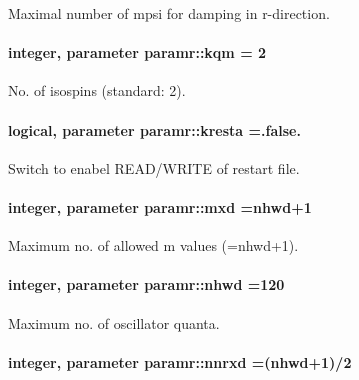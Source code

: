Maximal number of mpsi for damping in r-\/direction. 

\paragraph[{\texorpdfstring{kqm}{kqm}}]{\setlength{\rightskip}{0pt plus 5cm}integer, parameter paramr\+::kqm = 2}\hypertarget{namespaceparamr_af7be40bfd8856e8845a2587d4443e56b}{}\label{namespaceparamr_af7be40bfd8856e8845a2587d4443e56b}


No. of isospins (standard\+: 2). 

\paragraph[{\texorpdfstring{kresta}{kresta}}]{\setlength{\rightskip}{0pt plus 5cm}logical, parameter paramr\+::kresta =.false.}\hypertarget{namespaceparamr_a673c357a29cfbdb53822605a24b3ab51}{}\label{namespaceparamr_a673c357a29cfbdb53822605a24b3ab51}


Switch to enabel R\+E\+A\+D/\+W\+R\+I\+TE of restart file. 

\paragraph[{\texorpdfstring{mxd}{mxd}}]{\setlength{\rightskip}{0pt plus 5cm}integer, parameter paramr\+::mxd ={\bf nhwd}+1}\hypertarget{namespaceparamr_ae5d95bb2efa5483f6b31595801daa446}{}\label{namespaceparamr_ae5d95bb2efa5483f6b31595801daa446}


Maximum no. of allowed m values (=nhwd+1). 

\paragraph[{\texorpdfstring{nhwd}{nhwd}}]{\setlength{\rightskip}{0pt plus 5cm}integer, parameter paramr\+::nhwd =120}\hypertarget{namespaceparamr_a85e42468af30077429194d0dac1b9081}{}\label{namespaceparamr_a85e42468af30077429194d0dac1b9081}


Maximum no. of oscillator quanta. 

\paragraph[{\texorpdfstring{nnrxd}{nnrxd}}]{\setlength{\rightskip}{0pt plus 5cm}integer, parameter paramr\+::nnrxd =({\bf nhwd}+1)/2}\hypertarget{namespaceparamr_aae1715448aba3fff0e2cdf279c593f2b}{}\label{namespaceparamr_aae1715448aba3fff0e2cdf279c593f2b}


